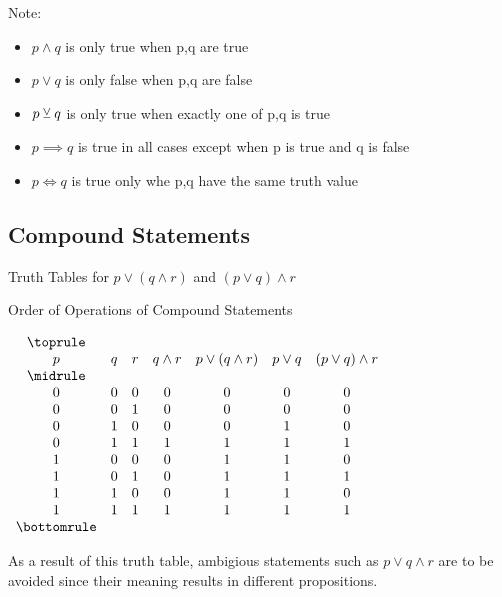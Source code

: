 Note:
\begin{itemize}
    \item $p \land q$ is only true when p,q are true
    \item $p \lor q$ is only false when p,q are false
    \item $p \veebar q$ is only true when exactly one of p,q is true
    \item $p \implies q$ is true in all cases except when p is true and q is false
    \item $p \iff q$ is true only whe p,q have the same truth value
\end{itemize}

\subsection{Compound Statements}

\begin{table}[!htb]
    \caption{Truth Tables for $p \lor (q \land r)$ and $(p \lor q) \land r$}
    \centering
    \begin{subtable}{\linewidth}
        \centering
        \caption*{Order of Operations of Compound Statements}
        \label{tbl:logical-order-of-ops}
        $\begin{array}{ *{7}{c} }
            \toprule \\
            p & q & r & q \land r & p \lor (q \land r) & p \lor q & (p \lor q) \land r \\
            \midrule \\
            0 & 0 & 0 & 0 & 0 & 0 & 0 \\
            0 & 0 & 1 & 0 & 0 & 0 & 0 \\
            0 & 1 & 0 & 0 & 0 & 1 & 0 \\
            0 & 1 & 1 & 1 & 1 & 1 & 1 \\
            1 & 0 & 0 & 0 & 1 & 1 & 0 \\
            1 & 0 & 1 & 0 & 1 & 1 & 1 \\
            1 & 1 & 0 & 0 & 1 & 1 & 0 \\
            1 & 1 & 1 & 1 & 1 & 1 & 1 \\
            \bottomrule
        \end{array}$
    \end{subtable}%
\end{table}

As a result of this truth table, ambigious statements
such as $p \lor q \land r$ are to be avoided since their
meaning results in different propositions.

